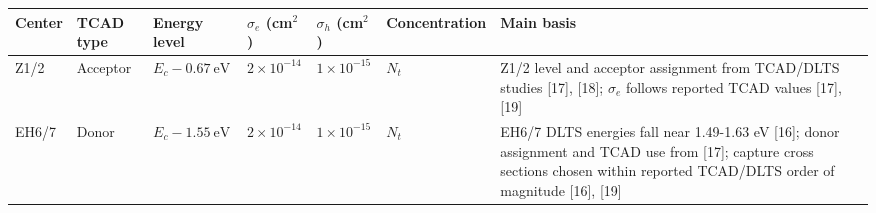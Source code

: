 \documentclass[
  10pt,
  a4paper,
]{ctexart}
\newcounter{none} %
\begin{document}
{\def\LTcaptype{none} %
\begin{longtable}[]{@{}
  >{\raggedright\arraybackslash}p{}
  >{\raggedright\arraybackslash}p{}
  >{\raggedright\arraybackslash}p{}
  >{\raggedleft\arraybackslash}p{}
  >{\raggedleft\arraybackslash}p{}
  >{\raggedleft\arraybackslash}p{}
  >{\raggedright\arraybackslash}p{}@{}}
\toprule\noalign{}
\begin{minipage}[b]{\linewidth}\raggedright
Center
\end{minipage} & \begin{minipage}[b]{\linewidth}\raggedright
TCAD type
\end{minipage} & \begin{minipage}[b]{\linewidth}\raggedright
Energy level
\end{minipage} & \begin{minipage}[b]{\linewidth}\raggedleft
\(\sigma_e\) (cm\(^2\))
\end{minipage} & \begin{minipage}[b]{\linewidth}\raggedleft
\(\sigma_h\) (cm\(^2\))
\end{minipage} & \begin{minipage}[b]{\linewidth}\raggedleft
Concentration
\end{minipage} & \begin{minipage}[b]{\linewidth}\raggedright
Main basis
\end{minipage} \\
\midrule\noalign{}
\endhead
\bottomrule\noalign{}
\endlastfoot
Z1/2 & Acceptor & \(E_c-0.67\ \mathrm{eV}\) & \(2\times10^{-14}\) &
\(1\times10^{-15}\) & \(N_t\) & Z1/2 level and acceptor assignment from
TCAD/DLTS studies {[}17{]}, {[}18{]}; \(\sigma_e\) follows reported TCAD
values {[}17{]}, {[}19{]} \\
EH6/7 & Donor & \(E_c-1.55\ \mathrm{eV}\) & \(2\times10^{-14}\) &
\(1\times10^{-15}\) & \(N_t\) & EH6/7 DLTS energies fall near 1.49-1.63
eV {[}16{]}; donor assignment and TCAD use from {[}17{]}; capture cross
sections chosen within reported TCAD/DLTS order of magnitude {[}16{]},
{[}19{]} \\
\end{longtable}
}
\end{document}
